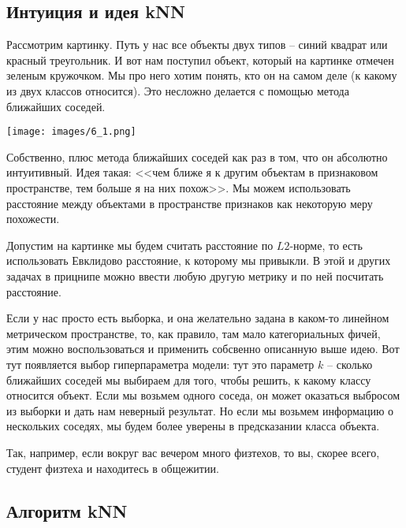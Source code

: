 \subsection*{Интуиция и идея kNN}

\begin{example}
Рассмотрим картинку. Путь у нас все объекты двух типов -- синий квадрат или красный треугольник. И вот нам поступил объект, который на картинке отмечен зеленым кружочком. Мы про него хотим понять, кто он на самом деле (к какому из двух классов относится). Это несложно делается с помощью метода ближайших соседей.
\end{example}

\begin{center}
    \texttt{[image: images/6\_1.png]}
\end{center}

Собственно, плюс метода ближайших соседей как раз в том, что он абсолютно интуитивный. Идея такая: <<чем ближе я к другим объектам в признаковом пространстве, тем больше я на них похож>>. 
Мы можем использовать расстояние между объектами в пространстве признаков как некоторую меру похожести.

Допустим на картинке мы будем считать расстояние по $L2$-норме, то есть использовать Евклидово расстояние, к которому мы привыкли. В этой и других задачах в прицнипе можно ввести любую другую метрику и по ней посчитать расстояние.

Если у нас просто есть выборка, и она желательно задана в каком-то линейном метрическом пространстве, то, как правило, там мало категориальных фичей, этим можно воспользоваться и применить собсвенно описанную выше идею. Вот тут появляется выбор гиперпараметра модели: тут это параметр $k$ -- сколько ближайших соседей мы выбираем для того, чтобы решить, к какому классу относится объект. Если мы возьмем одного соседа, он может оказаться выбросом из выборки и дать нам неверный результат. Но если мы возьмем информацию о нескольких соседях, мы будем более уверены в предсказании класса объекта. 

\begin{example}
Так, например, если вокруг вас вечером много физтехов, то вы, скорее всего, студент физтеха и находитесь в общежитии. 
\end{example}

\subsection*{Алгоритм kNN}

